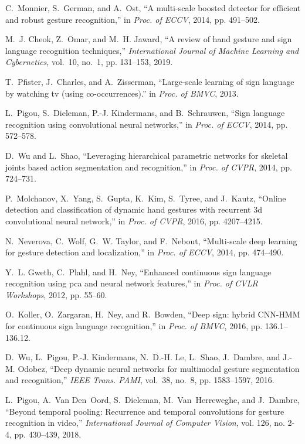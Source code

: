 \documentclass[journal]{IEEEtran}
\begin{document}
\begin{thebibliography}{10}
	C.~Monnier, S.~German, and A.~Ost, ``A multi-scale boosted detector for
	efficient and robust gesture recognition,'' in \emph{Proc. of ECCV}, 2014,
	pp. 491--502.
	
	M.~J. Cheok, Z.~Omar, and M.~H. Jaward, ``A review of hand gesture and sign
	language recognition techniques,'' \emph{International Journal of Machine
		Learning and Cybernetics}, vol.~10, no.~1, pp. 131--153, 2019.
	
	T.~Pfister, J.~Charles, and A.~Zisserman, ``Large-scale learning of sign
	language by watching tv (using co-occurrences).'' in \emph{Proc. of BMVC},
	2013.
	
	L.~Pigou, S.~Dieleman, P.-J. Kindermans, and B.~Schrauwen, ``Sign language
	recognition using convolutional neural networks,'' in \emph{Proc. of ECCV},
	2014, pp. 572--578.
	
	D.~Wu and L.~Shao, ``Leveraging hierarchical parametric networks for skeletal
	joints based action segmentation and recognition,'' in \emph{Proc. of CVPR},
	2014, pp. 724--731.
	
	P.~Molchanov, X.~Yang, S.~Gupta, K.~Kim, S.~Tyree, and J.~Kautz, ``Online
	detection and classification of dynamic hand gestures with recurrent 3d
	convolutional neural network,'' in \emph{Proc. of CVPR}, 2016, pp.
	4207--4215.
	
	N.~Neverova, C.~Wolf, G.~W. Taylor, and F.~Nebout, ``Multi-scale deep learning
	for gesture detection and localization,'' in \emph{Proc. of ECCV}, 2014, pp.
	474--490.
	
	Y.~L. Gweth, C.~Plahl, and H.~Ney, ``Enhanced continuous sign language
	recognition using pca and neural network features,'' in \emph{Proc. of CVLR
		Workshops}, 2012, pp. 55--60.
	
	O.~Koller, O.~Zargaran, H.~Ney, and R.~Bowden, ``Deep sign: hybrid {CNN}-{HMM}
	for continuous sign language recognition,'' in \emph{Proc. of BMVC}, 2016,
	pp. 136.1--136.12.
	
	D.~Wu, L.~Pigou, P.-J. Kindermans, N.~D.-H. Le, L.~Shao, J.~Dambre, and J.-M.
	Odobez, ``Deep dynamic neural networks for multimodal gesture segmentation
	and recognition,'' \emph{IEEE Trans. PAMI}, vol.~38, no.~8, pp. 1583--1597,
	2016.
	
	L.~Pigou, A.~Van Den~Oord, S.~Dieleman, M.~Van~Herreweghe, and J.~Dambre,
	``Beyond temporal pooling: Recurrence and temporal convolutions for gesture
	recognition in video,'' \emph{International Journal of Computer Vision}, vol.
	126, no. 2-4, pp. 430--439, 2018.
	

\end{thebibliography}
\end{document}
